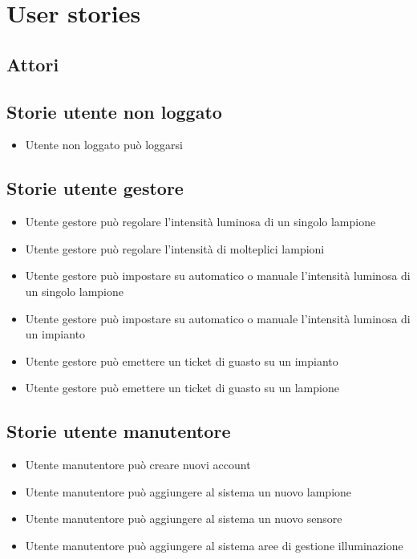 \chapter{User stories}

\section{Attori}\label{attori}

\section{Storie utente non loggato}

\begin{itemize}
    \item Utente non loggato può loggarsi
\end{itemize}

\section{Storie utente gestore}

\begin{itemize}
    \item Utente gestore può regolare l'intensità luminosa di un singolo lampione
    \item Utente gestore può regolare l'intensità di molteplici lampioni
    \item Utente gestore può impostare su automatico o manuale l'intensità luminosa di un singolo lampione
    \item Utente gestore può impostare su automatico o manuale l'intensità luminosa di un impianto
    \item Utente gestore può emettere un ticket di guasto su un impianto
    \item Utente gestore può emettere un ticket di guasto su un lampione
\end{itemize}



\section{Storie utente manutentore}
\begin{itemize}
    \item Utente manutentore può creare nuovi account
    \item Utente manutentore può aggiungere al sistema un nuovo lampione
    \item Utente manutentore può aggiungere al sistema un nuovo sensore
    \item Utente manutentore può aggiungere al sistema aree di gestione illuminazione
\end{itemize}


